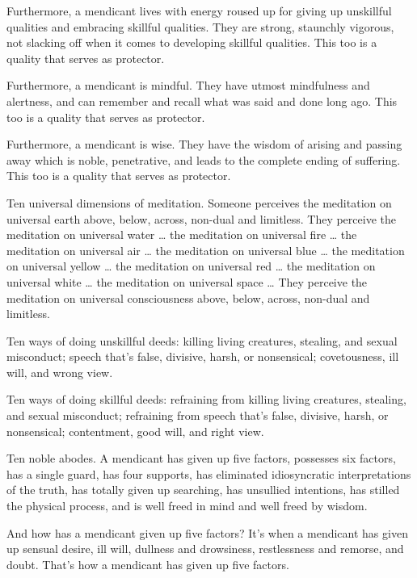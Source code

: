 \documentclass[12pt,openany]{book}%
\begin{document}
Furthermore, a mendicant lives with energy roused up for giving up unskillful qualities and embracing skillful qualities. They are strong, staunchly vigorous, not slacking off when it comes to developing skillful qualities. This too is a quality that serves as protector. 

Furthermore, a mendicant is mindful. They have utmost mindfulness and alertness, and can remember and recall what was said and done long ago. This too is a quality that serves as protector. 

Furthermore, a mendicant is wise. They have the wisdom of arising and passing away which is noble, penetrative, and leads to the complete ending of suffering. This too is a quality that serves as protector. 

Ten universal dimensions of meditation. Someone perceives the meditation on universal earth above, below, across, non-dual and limitless. They perceive the meditation on universal water … the meditation on universal fire … the meditation on universal air … the meditation on universal blue … the meditation on universal yellow … the meditation on universal red … the meditation on universal white … the meditation on universal space … They perceive the meditation on universal consciousness above, below, across, non-dual and limitless. 

Ten ways of doing unskillful deeds: killing living creatures, stealing, and sexual misconduct; speech that’s false, divisive, harsh, or nonsensical; covetousness, ill will, and wrong view. 

Ten ways of doing skillful deeds: refraining from killing living creatures, stealing, and sexual misconduct; refraining from speech that’s false, divisive, harsh, or nonsensical; contentment, good will, and right view. 

Ten noble abodes. A mendicant has given up five factors, possesses six factors, has a single guard, has four supports, has eliminated idiosyncratic interpretations of the truth, has totally given up searching, has unsullied intentions, has stilled the physical process, and is well freed in mind and well freed by wisdom. 

And how has a mendicant given up five factors? It’s when a mendicant has given up sensual desire, ill will, dullness and drowsiness, restlessness and remorse, and doubt. That’s how a mendicant has given up five factors. 
\end{document}
